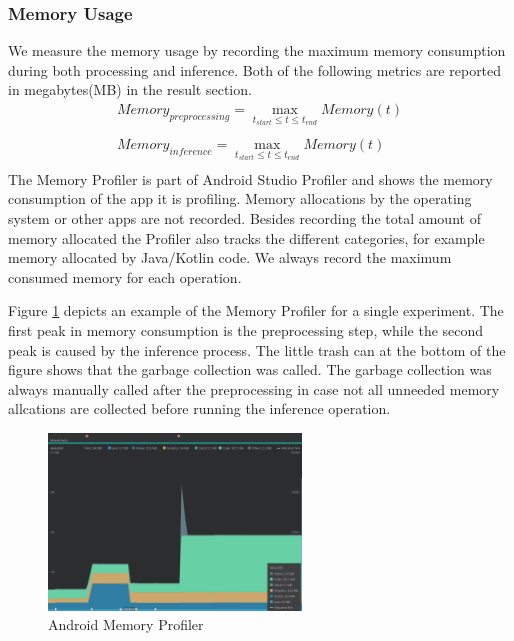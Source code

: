\subsubsection{Memory Usage}
We measure the memory usage by recording the maximum memory consumption during both processing and inference. Both of the following metrics are reported in megabytes(MB) in the result section.
\begin{equation*}
\begin{gathered}
Memory_{preprocessing} = \max\limits_{t_{start} \leq t \leq t_{end}} Memory(t)\\\\
Memory_{inference} = \max\limits_{t_{start} \leq t \leq t_{end}} Memory(t)\\
\end{gathered}
\end{equation*}
The Memory Profiler is part of Android Studio Profiler and shows the memory consumption of the app it is profiling. Memory allocations by the operating system or other apps are not recorded. Besides recording the total amount of memory allocated the Profiler also tracks the different categories, for example memory allocated by Java/Kotlin code. We always record the maximum consumed memory for each operation.

Figure \ref{fig:prof_mem} depicts an example of the Memory Profiler for a single experiment. The first peak in memory consumption is the preprocessing step, while the second peak is caused by the inference process.
The little trash can at the bottom of the figure shows that the garbage collection was called. The garbage collection was always manually called after the preprocessing in case not all unneeded memory allcations are collected before running the inference operation. 
\begin{figure}[H]
\centering
\includegraphics[width=0.6\textwidth]{./Bilder/profiler_MEM}
\caption{Android Memory Profiler}
\label{fig:prof_mem}
\end{figure}
